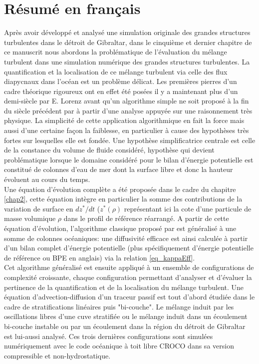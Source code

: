 \section{Résumé en français}
Après avoir développé et analysé une simulation originale des grandes structures turbulentes dans le détroit de Gibraltar, dans le cinquième et dernier chapitre de ce manuscrit nous abordons la problématique de l'évaluation du mélange turbulent dans une simulation numérique des grandes structures turbulentes. La quantification et la localisation de ce mélange turbulent via celle des flux diapycnaux dans l'océan est un problème délicat. Les premières pierres d'un cadre théorique rigoureux ont en effet été posées il y a maintenant plus d'un demi-siècle par E. Lorenz \citep{lorenz_available_1955} avant qu'un algorithme simple ne soit proposé à la fin du siècle précédent par \cite{winters_available_1995} à partir d'une analyse appuyée sur une raisonnement très physique. La simplicité de cette application algorithmique en fait la force mais aussi d'une certaine façon la faiblesse, en particulier à cause des hypothèses très fortes sur lesquelles elle est fondée. Une hypothèse simplificatrice centrale est celle de la constance du volume de fluide considéré, hypothèse qui devient problématique lorsque le domaine considéré pour le bilan d'énergie potentielle est constitué de colonnes d'eau de mer dont la surface libre et donc la hauteur évoluent au cours du temps.\\
Une équation d'évolution complète a été proposée dans le cadre du chapitre \ref{chap2}, cette équation intègre en particulier la somme des contributions de la variation de surface en $dz^*/dt$ ($z^*(\rho)$ représentant ici la cote d'une particule de masse volumique $\rho$ dans le profil de référence réarrangé. A partir de cette équation d'évolution, l'algorithme classique proposé par \cite{winters_available_1995} est généralisé à une somme de colonnes océaniques: une diffusivité efficace est ainsi calculée à partir d'un bilan complet d'énergie potentielle (plus spécifiquement d'énergie potentielle de référence ou BPE en anglais) via la relation \ref{eq_kappaEff}.\\
Cet algorithme généralisé est ensuite appliqué à un ensemble de configurations de complexité croissante, chaque configuration permettant d'analyser et d'évaluer la pertinence de la quantification et de la localisation du mélange turbulent. Une équation d'advection-diffusion d'un traceur passif est tout d'abord étudiée dans le cadre de stratifications linéaires puis "bi-couche". Le mélange induit par les oscillations libres d'une cuve stratifiée ou le mélange induit dans un écoulement bi-couche instable ou par un écoulement dans la région du détroit de Gibraltar est lui-aussi analysé. Ces trois dernières configurations sont simulées numériquement avec le code océanique à toit libre CROCO dans sa version compressible et non-hydrostatique.\\
